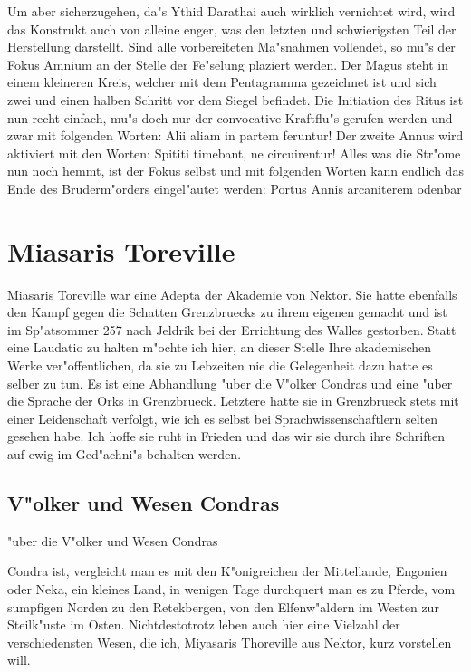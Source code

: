 \documentclass[a5paper,8pt]{book}
\begin{document}
Um aber sicherzugehen, da"s Ythid Darathai auch wirklich vernichtet wird, wird das Konstrukt auch von alleine enger, was den letzten und schwierigsten Teil der Herstellung darstellt.
Sind alle vorbereiteten Ma"snahmen vollendet, so mu"s der Fokus Amnium an der Stelle der Fe"selung plaziert werden. Der Magus steht in einem kleineren Kreis, welcher mit dem Pentagramma gezeichnet ist und sich zwei und einen halben Schritt vor dem Siegel befindet.
Die Initiation des Ritus ist nun recht einfach, mu"s doch nur der convocative Kraftflu"s gerufen werden und zwar mit folgenden Worten:
Alii aliam in partem feruntur!
Der zweite Annus wird aktiviert mit den Worten:
Spititi timebant, ne circuirentur!
Alles was die Str"ome nun noch hemmt, ist der Fokus selbst und mit folgenden Worten kann endlich das Ende des Bruderm"orders eingel"autet werden:
Portus Annis arcaniterem odenbar 

\newpage

\section{Miasaris Toreville}

Miasaris Toreville war eine Adepta der Akademie von Nektor. Sie hatte ebenfalls den Kampf gegen die Schatten Grenzbruecks zu ihrem eigenen gemacht und ist im Sp"atsommer 257 nach Jeldrik bei der Errichtung des Walles gestorben.
Statt eine Laudatio zu halten m"ochte ich hier, an dieser Stelle Ihre akademischen Werke ver"offentlichen, da sie zu Lebzeiten nie die Gelegenheit dazu hatte es selber zu tun. Es ist eine Abhandlung "uber die V"olker Condras und eine "uber die Sprache der Orks in Grenzbrueck. Letztere hatte sie in Grenzbrueck stets mit einer Leidenschaft verfolgt, wie ich es selbst bei Sprachwissenschaftlern selten gesehen habe. Ich hoffe sie ruht in Frieden und das wir sie durch ihre Schriften auf ewig im Ged"achni"s behalten werden.

\subsection{V"olker und Wesen Condras}

"uber die V"olker und Wesen Condras

Condra ist, vergleicht man es mit den K"onigreichen der Mittellande, Engonien oder Neka, ein kleines Land, in wenigen Tage durchquert man es zu Pferde, vom sumpfigen Norden zu den Retekbergen, von den Elfenw"aldern im Westen zur Steilk"uste im Osten. Nichtdestotrotz leben auch hier eine Vielzahl der verschiedensten Wesen, die ich, Miyasaris Thoreville aus Nektor, kurz vorstellen will. 
\end{document}
